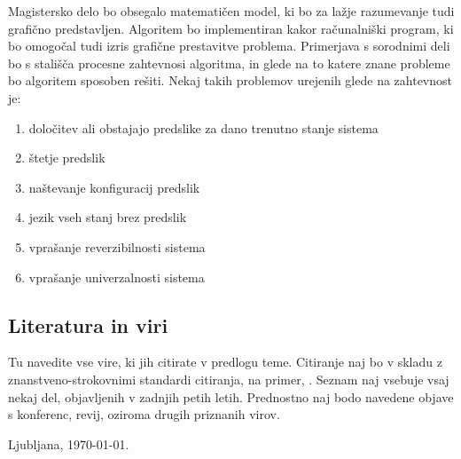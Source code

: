 \documentclass[a4paper, 12pt]{article}
\begin{document}
Magistersko delo bo obsegalo matematičen model, ki bo za lažje razumevanje tudi grafično predstavljen.
Algoritem bo implementiran kakor računalniški program, ki bo omogočal tudi izris grafične prestavitve
problema. Primerjava s sorodnimi deli bo s stališča procesne zahtevnosi algoritma, in glede na to
katere znane probleme bo algoritem sposoben rešiti. Nekaj takih problemov urejenih glede na zahtevnost je:
\begin{enumerate}
\item določitev ali obstajajo predslike za dano trenutno stanje sistema
\item štetje predslik
\item naštevanje konfiguracij predslik
\item jezik vseh stanj brez predslik
\item vprašanje reverzibilnosti sistema
\item vprašanje univerzalnosti sistema
\end{enumerate}

\subsection{Literatura in viri}
\label{literatura}

Tu navedite vse vire, ki jih citirate v predlogu teme. Citiranje naj bo v skladu z
znanstveno-strokovnimi standardi citiranja, na primer, \cite{Zivkovic2004}.
Seznam naj vsebuje vsaj nekaj del, objavljenih v zadnjih petih letih.
Prednostno naj bodo navedene objave s konferenc, revij, oziroma drugih priznanih virov.

\renewcommand\refname{}
\vspace{-50px}




\bigskip

Ljubljana, \today .
\end{document}
